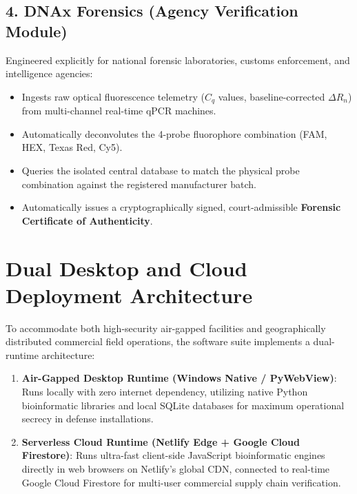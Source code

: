 \subsection{4. DNAx Forensics\textsuperscript{\textcopyright} (Agency Verification Module)}
Engineered explicitly for national forensic laboratories, customs enforcement, and intelligence agencies:
\begin{itemize}
    \item Ingests raw optical fluorescence telemetry ($C_q$ values, baseline-corrected $\Delta R_n$) from multi-channel real-time qPCR machines.
    \item Automatically deconvolutes the 4-probe fluorophore combination (FAM, HEX, Texas Red, Cy5).
    \item Queries the isolated central database to match the physical probe combination against the registered manufacturer batch.
    \item Automatically issues a cryptographically signed, court-admissible \textbf{Forensic Certificate of Authenticity}.
\end{itemize}

\section{Dual Desktop and Cloud Deployment Architecture}
To accommodate both high-security air-gapped facilities and geographically distributed commercial field operations, the software suite implements a dual-runtime architecture:
\begin{enumerate}
    \item \textbf{Air-Gapped Desktop Runtime (Windows Native / PyWebView)}: Runs locally with zero internet dependency, utilizing native Python bioinformatic libraries and local SQLite databases for maximum operational secrecy in defense installations.
    \item \textbf{Serverless Cloud Runtime (Netlify Edge + Google Cloud Firestore)}: Runs ultra-fast client-side JavaScript bioinformatic engines directly in web browsers on Netlify's global CDN, connected to real-time Google Cloud Firestore for multi-user commercial supply chain verification.
\end{enumerate}
